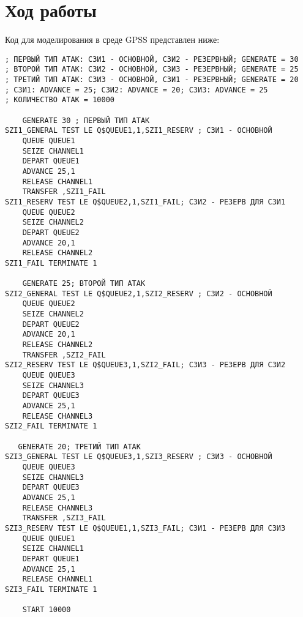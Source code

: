 \section{Ход работы}

Код для моделирования в среде GPSS представлен ниже:

\begin{Verbatim}[frame=single,fontsize=\small]
; ПЕРВЫЙ ТИП АТАК: СЗИ1 - ОСНОВНОЙ, СЗИ2 - РЕЗЕРВНЫЙ; GENERATE = 30
; ВТОРОЙ ТИП АТАК: СЗИ2 - ОСНОВНОЙ, СЗИ3 - РЕЗЕРВНЫЙ; GENERATE = 25 
; ТРЕТИЙ ТИП АТАК: СЗИ3 - ОСНОВНОЙ, СЗИ1 - РЕЗЕРВНЫЙ; GENERATE = 20
; СЗИ1: ADVANCE = 25; СЗИ2: ADVANCE = 20; СЗИ3: ADVANCE = 25
; КОЛИЧЕСТВО АТАК = 10000

    GENERATE 30 ; ПЕРВЫЙ ТИП АТАК
SZI1_GENERAL TEST LE Q$QUEUE1,1,SZI1_RESERV ; СЗИ1 - ОСНОВНОЙ
    QUEUE QUEUE1
    SEIZE CHANNEL1
    DEPART QUEUE1
    ADVANCE 25,1
    RELEASE CHANNEL1
    TRANSFER ,SZI1_FAIL
SZI1_RESERV TEST LE Q$QUEUE2,1,SZI1_FAIL; СЗИ2 - РЕЗЕРВ ДЛЯ СЗИ1
    QUEUE QUEUE2
    SEIZE CHANNEL2
    DEPART QUEUE2
    ADVANCE 20,1
    RELEASE CHANNEL2
SZI1_FAIL TERMINATE 1

    GENERATE 25; ВТОРОЙ ТИП АТАК
SZI2_GENERAL TEST LE Q$QUEUE2,1,SZI2_RESERV ; СЗИ2 - ОСНОВНОЙ
    QUEUE QUEUE2
    SEIZE CHANNEL2
    DEPART QUEUE2
    ADVANCE 20,1
    RELEASE CHANNEL2
    TRANSFER ,SZI2_FAIL
SZI2_RESERV TEST LE Q$QUEUE3,1,SZI2_FAIL; СЗИ3 - РЕЗЕРВ ДЛЯ СЗИ2
    QUEUE QUEUE3
    SEIZE CHANNEL3
    DEPART QUEUE3
    ADVANCE 25,1
    RELEASE CHANNEL3
SZI2_FAIL TERMINATE 1

   GENERATE 20; ТРЕТИЙ ТИП АТАК
SZI3_GENERAL TEST LE Q$QUEUE3,1,SZI3_RESERV ; СЗИ3 - ОСНОВНОЙ
    QUEUE QUEUE3
    SEIZE CHANNEL3
    DEPART QUEUE3
    ADVANCE 25,1
    RELEASE CHANNEL3
    TRANSFER ,SZI3_FAIL
SZI3_RESERV TEST LE Q$QUEUE1,1,SZI3_FAIL; СЗИ1 - РЕЗЕРВ ДЛЯ СЗИ3
    QUEUE QUEUE1
    SEIZE CHANNEL1
    DEPART QUEUE1
    ADVANCE 25,1
    RELEASE CHANNEL1
SZI3_FAIL TERMINATE 1

    START 10000
\end{Verbatim}
